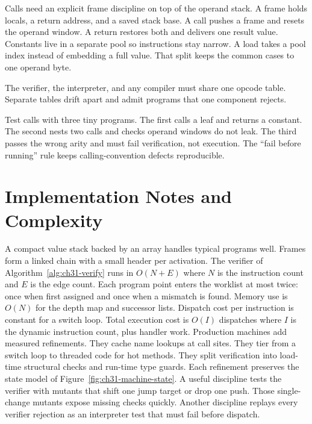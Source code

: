 Calls need an explicit frame discipline on top of the operand stack.
A frame holds locals, a return address, and a saved stack base.
A call pushes a frame and resets the operand window.
A return restores both and delivers one result value.
Constants live in a separate pool so instructions stay narrow.
A load takes a pool index instead of embedding a full value.
That split keeps the common cases to one operand byte.
\begin{ccwarning}
The verifier, the interpreter, and any compiler must share one opcode table.
Separate tables drift apart and admit programs that one component rejects.
\end{ccwarning}
Test calls with three tiny programs.
The first calls a leaf and returns a constant.
The second nests two calls and checks operand windows do not leak.
The third passes the wrong arity and must fail verification, not execution.
The \enquote{fail before running} rule keeps calling-convention defects reproducible.

\section{Implementation Notes and Complexity}\label{sec:ch31-implementation}

A compact value stack backed by an array handles typical programs well.
Frames form a linked chain with a small header per activation.
The verifier of Algorithm~\ref{alg:ch31-verify} runs in $O(N + E)$ where $N$ is the instruction count and $E$ is the edge count.
Each program point enters the worklist at most twice: once when first assigned and once when a mismatch is found.
Memory use is $O(N)$ for the depth map and successor lists.
Dispatch cost per instruction is constant for a switch loop.
Total execution cost is $O(I)$ dispatches where $I$ is the dynamic instruction count, plus handler work.
Production machines add measured refinements.
They cache name lookups at call sites.
They tier from a switch loop to threaded code for hot methods.
They split verification into load-time structural checks and run-time type guards.
Each refinement preserves the state model of Figure~\ref{fig:ch31-machine-state}.
A useful discipline tests the verifier with mutants that shift one jump target or drop one push.
Those single-change mutants expose missing checks quickly.
Another discipline replays every verifier rejection as an interpreter test that must fail before dispatch.


